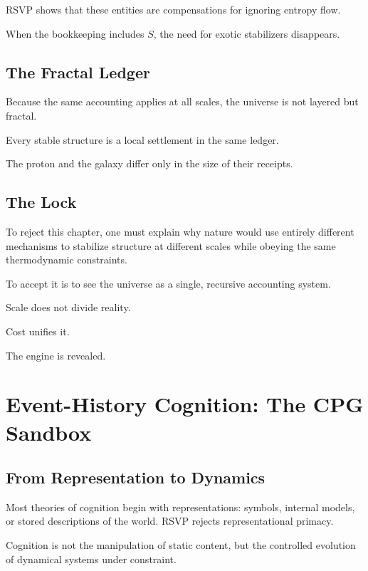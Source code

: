 \documentclass[11pt]{book}
\begin{document}
RSVP shows that these entities are compensations for ignoring entropy flow.

When the bookkeeping includes \(S\), the need for exotic stabilizers disappears.

\section{The Fractal Ledger}

Because the same accounting applies at all scales, the universe is not layered but fractal.

Every stable structure is a local settlement in the same ledger.

The proton and the galaxy differ only in the size of their receipts.

\section{The Lock}

To reject this chapter, one must explain why nature would use entirely different mechanisms to stabilize structure at different scales while obeying the same thermodynamic constraints.

To accept it is to see the universe as a single, recursive accounting system.

Scale does not divide reality.

Cost unifies it.

The engine is revealed.


\chapter{Event-History Cognition: The CPG Sandbox}

\section{From Representation to Dynamics}

Most theories of cognition begin with representations: symbols, internal models, or stored descriptions of the world. RSVP rejects representational primacy.

Cognition is not the manipulation of static content, but the controlled evolution of dynamical systems under constraint.
\end{document}
